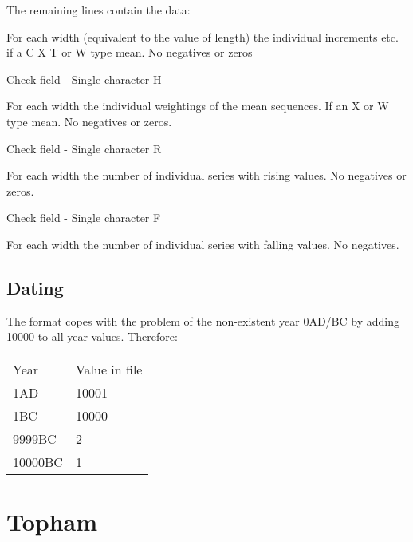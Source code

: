 \begin{enumerate*}
\end{enumerate*}

The remaining lines contain the data:

\begin{itemize*}
 \item For each width (equivalent to the value of length) the individual increments etc. if a C X T or W type mean.  No negatives or zeros
 \item Check field - Single character H
 \item For each width the individual weightings of the mean sequences. If an X or W type mean.  No negatives or zeros.
 \item Check field - Single character R
 \item For each width the number of individual series with rising values.  No negatives or zeros.
 \item Check field - Single character F
 \item For each width the number of individual series with falling values. No negatives.
\end{itemize*}

\section{Dating}

The format copes with the problem of the non-existent year 0AD/BC by adding 10000 to all year values. Therefore: 

\begin{center}
\begin{tabular}{ll}
Year & Value in file\\
1AD & 10001\\
1BC & 10000\\
9999BC & 2\\
10000BC & 1
\end{tabular}
\end{center}




\chapter{Topham}


